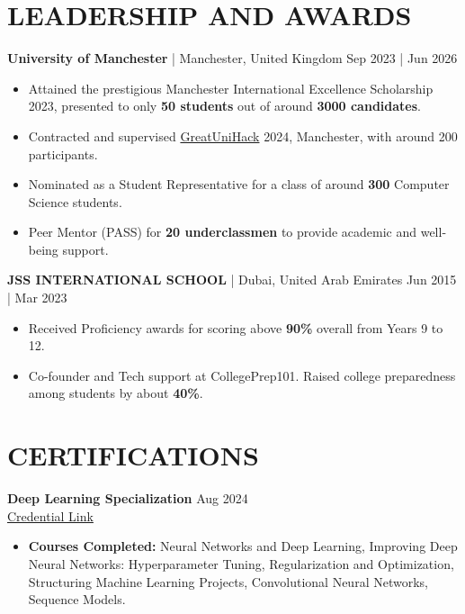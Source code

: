 \documentclass[a4paper,1.5pt]{extarticle}
\begin{document}
\section*{LEADERSHIP AND AWARDS}
\noindent
\textbf{University of Manchester} | Manchester, United Kingdom \hfill Sep 2023 | Jun 2026 %
\begin{itemize}
    \item Attained the prestigious Manchester International Excellence Scholarship 2023, presented to only \textbf{50 students} out of around \textbf{3000 candidates}.
    \item Contracted and supervised \href{https://www.greatunihack.com}{GreatUniHack} 2024, Manchester, with around 200 participants.
    \item Nominated as a Student Representative for a class of around \textbf{300} Computer Science students.
    \item Peer Mentor (PASS) for \textbf{20 underclassmen} to provide academic and well-being support.
\end{itemize}

\noindent
\textbf{JSS INTERNATIONAL SCHOOL} | Dubai, United Arab Emirates \hfill Jun 2015 | Mar 2023
\begin{itemize}
    \item Received Proficiency awards for scoring above \textbf{90\%} overall from Years 9 to 12.
    \item Co-founder and Tech support at CollegePrep101. Raised college preparedness among students by about \textbf{40\%}.
\end{itemize}


\section*{CERTIFICATIONS}
\noindent
\textbf{Deep Learning Specialization} \hfill Aug 2024 \\
\href{https://www.coursera.org/account/accomplishments/specialization/LR4ZVQP24B9B}{Credential Link}
\begin{itemize}
    \item \textbf{Courses Completed:} Neural Networks and Deep Learning, Improving Deep Neural Networks: Hyperparameter Tuning, Regularization and Optimization, Structuring Machine Learning Projects, Convolutional Neural Networks, Sequence Models.
    
\end{itemize}


\end{document}
